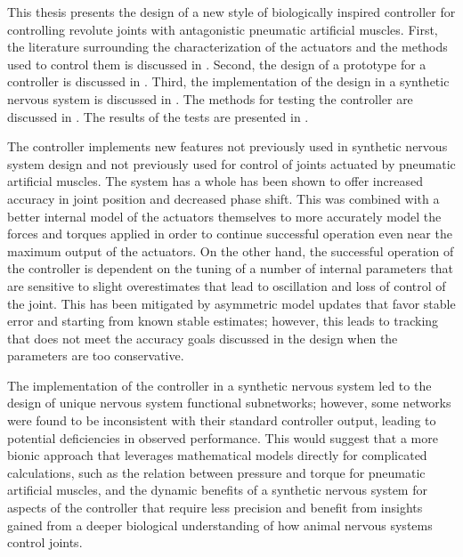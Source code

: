 
This thesis presents the design of a new style of biologically inspired
controller for controlling revolute joints with antagonistic pneumatic
artificial muscles. First, the literature surrounding the characterization of
the actuators and the methods used to control them is discussed in
. Second, the
design of a prototype for a controller is discussed in
. Third, the implementation of the design in a
synthetic nervous system is discussed in . The methods
for testing the controller are discussed in . The results of
the tests are presented in .

The controller implements new features not previously used in synthetic nervous
system design and not previously used for control of joints actuated by
pneumatic artificial muscles. The system has a whole has been shown to offer
increased accuracy in joint position and decreased phase shift. This was
combined with a better internal model of the actuators themselves to more
accurately model the forces and torques applied in order to continue successful
operation even near the maximum output of the actuators. On the other hand, the
successful operation of the controller is dependent on the tuning of a number of
internal parameters that are sensitive to slight overestimates that lead to
oscillation and loss of control of the joint. This has been mitigated by
asymmetric model updates that favor stable error and starting from known stable
estimates; however, this leads to tracking that does not meet the accuracy goals
discussed in the design when the parameters are too conservative.

The implementation of the controller in a synthetic nervous system led to the
design of unique nervous system functional subnetworks; however, some networks
were found to be inconsistent with their standard controller output, leading to
potential deficiencies in observed performance. This would suggest that a more
bionic approach that leverages mathematical models directly for complicated
calculations, such as the relation between pressure and torque for pneumatic
artificial muscles, and the dynamic benefits of a synthetic nervous system for
aspects of the controller that require less precision and benefit from insights
gained from a deeper biological understanding of how animal nervous systems
control joints.


